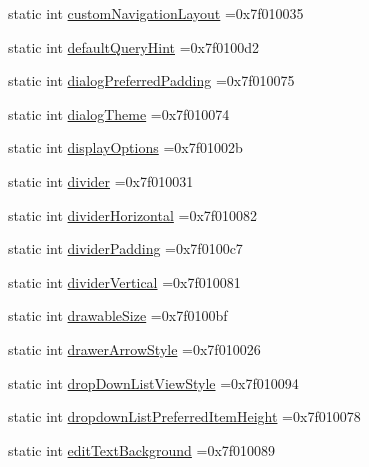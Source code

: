 \begin{DoxyCompactItemize}
\item 
static int \hyperlink{classandroid_1_1support_1_1v7_1_1appcompat_1_1R_1_1attr_aa4815525f2f6a0d8ad7614131e4db6d6}{custom\+Navigation\+Layout} =0x7f010035
\item 
static int \hyperlink{classandroid_1_1support_1_1v7_1_1appcompat_1_1R_1_1attr_a27da04996f4109d8ab6b9d161ca0a924}{default\+Query\+Hint} =0x7f0100d2
\item 
static int \hyperlink{classandroid_1_1support_1_1v7_1_1appcompat_1_1R_1_1attr_a8d8cccb8f3afab5313a1361426709f21}{dialog\+Preferred\+Padding} =0x7f010075
\item 
static int \hyperlink{classandroid_1_1support_1_1v7_1_1appcompat_1_1R_1_1attr_a28476f24cdf79d9dc7f352e4daf95ecf}{dialog\+Theme} =0x7f010074
\item 
static int \hyperlink{classandroid_1_1support_1_1v7_1_1appcompat_1_1R_1_1attr_adc627bc21e2b2c5f1a2d582b13ddd6ca}{display\+Options} =0x7f01002b
\item 
static int \hyperlink{classandroid_1_1support_1_1v7_1_1appcompat_1_1R_1_1attr_a8f75111bd93530bdbf366ffa149e524f}{divider} =0x7f010031
\item 
static int \hyperlink{classandroid_1_1support_1_1v7_1_1appcompat_1_1R_1_1attr_a447c1b9600c69124b589aa4532867757}{divider\+Horizontal} =0x7f010082
\item 
static int \hyperlink{classandroid_1_1support_1_1v7_1_1appcompat_1_1R_1_1attr_a8e3b4563691b41794d6024946fd26078}{divider\+Padding} =0x7f0100c7
\item 
static int \hyperlink{classandroid_1_1support_1_1v7_1_1appcompat_1_1R_1_1attr_aa203492b19a06c186b417263d520f4e2}{divider\+Vertical} =0x7f010081
\item 
static int \hyperlink{classandroid_1_1support_1_1v7_1_1appcompat_1_1R_1_1attr_a3b065ae622136249bbdcb92a222420b6}{drawable\+Size} =0x7f0100bf
\item 
static int \hyperlink{classandroid_1_1support_1_1v7_1_1appcompat_1_1R_1_1attr_ac61eb48305cf35bb5538f1431089e7b1}{drawer\+Arrow\+Style} =0x7f010026
\item 
static int \hyperlink{classandroid_1_1support_1_1v7_1_1appcompat_1_1R_1_1attr_a983f0eda5b58e2bd8586fe66c18b0ec9}{drop\+Down\+List\+View\+Style} =0x7f010094
\item 
static int \hyperlink{classandroid_1_1support_1_1v7_1_1appcompat_1_1R_1_1attr_a29d0c6e43e9ec5af313b68651d53f4ec}{dropdown\+List\+Preferred\+Item\+Height} =0x7f010078
\item 
static int \hyperlink{classandroid_1_1support_1_1v7_1_1appcompat_1_1R_1_1attr_a12d7ef83c1530a4fd506091342cbf601}{edit\+Text\+Background} =0x7f010089

\end{DoxyCompactItemize}
